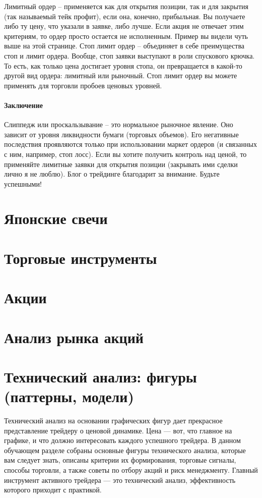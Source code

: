 \documentclass[a5paper]{article}
\begin{document}
    Лимитный ордер – применяется как для открытия позиции, так и для закрытия (так называемый тейк профит), если она, конечно, прибыльная. Вы получаете либо ту цену, что указали в заявке, либо лучше. Если акция не отвечает этим критериям, то ордер просто остается не исполненным. Пример вы видели чуть выше на этой странице.
    Стоп лимит ордер – объединяет в себе преимущества стоп и лимит ордера. Вообще, стоп заявки выступают в роли спускового крючка. То есть, как только цена достигает уровня стопа, он превращается в какой-то другой вид ордера: лимитный или рыночный. Стоп лимит ордер вы можете применять для торговли пробоев ценовых уровней.

\paragraph{Заключение}

Слиппедж или проскальзывание – это нормальное рыночное явление. Оно зависит от уровня ликвидности бумаги (торговых объемов). Его негативные последствия проявляются только при использовании маркет ордеров (и связанных с ним, например, стоп лосс). Если вы хотите получить контроль над ценой, то применяйте лимитные заявки для открытия позиции (закрывать ими сделки лично я не люблю). Блог о трейдинге благодарит за внимание. Будьте успешными!

\section{Японские свечи}

\section{Торговые инструменты}

\section{Акции}

\section{Анализ рынка акций}

\section{Технический анализ: фигуры (паттерны, модели)}

Технический анализ на основании графических фигур дает прекрасное
представление трейдеру о ценовой динамике. Цена — вот, что главное на
графике, и что должно интересовать каждого успешного трейдера. В
данном обучающем разделе собраны основные фигуры технического анализа,
которые вам следует знать, описаны критерии их формирования, торговые
сигналы, способы торговли, а также советы по отбору акций и риск
менеджменту. Главный инструмент активного трейдера — это технический
анализ, эффективность которого приходит с практикой.
\end{document}
